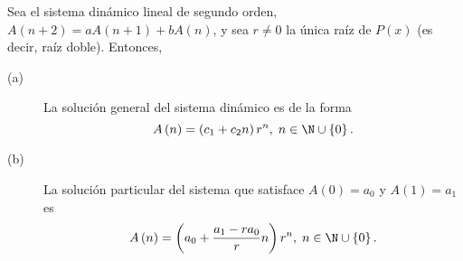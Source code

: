 \begin{ftheorem}[]
\normalfont Sea el sistema dinámico lineal de segundo orden, $\displaystyle A\left(n+2\right) = aA\left(n+1\right) + bA\left(n\right) $, y sea $\displaystyle r \neq 0 $ la única raíz de $\displaystyle P\left(x\right) $ (es decir, raíz doble). Entonces,
\begin{description}
\item[(a)] La solución general del sistema dinámico es de la forma
	\[A\left(n\right) = \left(c_{1}+c_{2}n\right)r^{n} , \; n \in \N \cup \left\{ 0\right\} .\]
\item[(b)] La solución particular del sistema que satisface $\displaystyle A\left(0\right) = a_{0} $ y $\displaystyle A\left(1\right) = a_{1} $ es
	\[A\left(n\right) = \left(a_{0} + \frac{a_{1}-ra_{0}}{r}n\right)r^{n}, \; n \in \N \cup \left\{ 0\right\}  .\]
\end{description}
\end{ftheorem}
